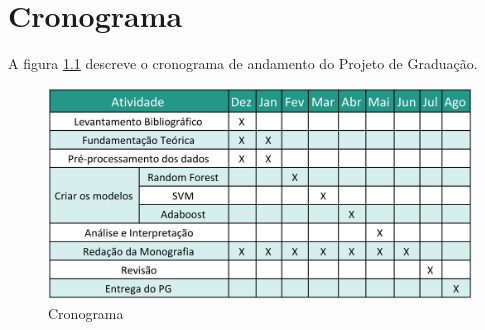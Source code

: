 \chapter{Cronograma}
A figura \ref{fig:cronograma} descreve o cronograma de andamento do Projeto de Graduação.

\begin{figure}[h!]
    \centering
    \includegraphics[scale=0.3]{Imagens/Cronograma.png}
    \caption{Cronograma}
    \label{fig:cronograma}
\end{figure}